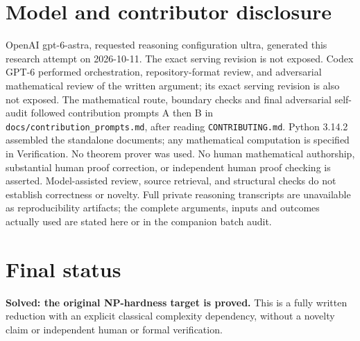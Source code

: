 \documentclass[11pt]{article}
\begin{document}
\section{Model and contributor disclosure}
OpenAI gpt-6-astra, requested reasoning configuration ultra, generated this research
attempt on 2026-10-11. The exact serving revision is not exposed. Codex GPT-6
performed orchestration, repository-format review, and adversarial mathematical review of the written argument; its exact serving revision
is also not exposed. The mathematical route, boundary checks and final adversarial
self-audit followed contribution prompts A then B in
\texttt{docs/contribution\_prompts.md}, after reading \texttt{CONTRIBUTING.md}.
Python 3.14.2 assembled the standalone documents; any mathematical computation is
specified in Verification. No theorem prover was used. No human mathematical
authorship, substantial human proof correction, or independent human proof checking
is asserted. Model-assisted review, source retrieval, and structural checks do not
establish correctness or novelty. Full private reasoning transcripts are unavailable
as reproducibility artifacts; the complete arguments, inputs and outcomes actually
used are stated here or in the companion batch audit.
\section{Final status}
\textbf{Solved: the original NP-hardness target is proved.} This is a fully written
reduction with an explicit classical complexity dependency, without a novelty claim
or independent human or formal verification.
\end{document}
